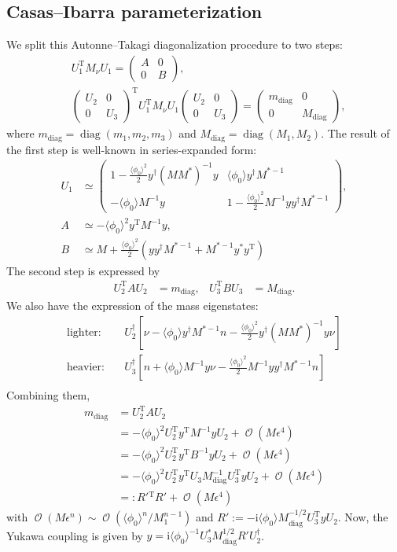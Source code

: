 \documentclass[a4paper,11pt]{scrartcl}
\numberwithin{equation}{section}
\newcommand\w[1]{_{\mathrm{#1}}}
\newcommand\ii{\mathrm{i}}
\newcommand\pmat[1]{\begin{pmatrix}#1\end{pmatrix}}
\DeclareMathOperator{\Order}{\mathcal{O}}
\newcommand\vev[1]{\langle#1\rangle}
\newcommand\YN{y}
\newcommand{\trans}{^{\mathrm T}}
\newcommand{\spmat}[1]{\left(\begin{smallmatrix}#1\end{smallmatrix}\right)}
\DeclareMathOperator{\diag}{\mathrm{diag}}
\begin{document}
\subsection{Casas--Ibarra parameterization}
We split this Autonne--Takagi diagonalization procedure to two steps:
\begin{align}
   &U_1\trans  M_\nu U_1 = \spmat{A& 0 \\ 0&B},\\
   &\spmat{U_2&0\\0&U_3}\trans U_1\trans M_\nu U_1 \spmat{U_2&0\\0&U_3} = \spmat{m\w{diag} & 0 \\ 0 & M\w{diag}},
\end{align}
where $m\w{diag}=\diag(m_1, m_2, m_3)$ and $M\w{diag}=\diag(M_1, M_2)$.
The result of the first step is well-known in series-expanded form:
\begin{align}
U_1 &\simeq \pmat{
  1 - \frac{\vev{\phi_0}^2}{2}\YN^\dagger (MM^*)^{-1}\YN &
 \vev{\phi_0} \YN^\dagger M^{*-1}
\\
-\vev{\phi_0} M^{-1}\YN &
  1 - \frac{\vev{\phi_0}^2}{2} M^{-1}\YN\YN^\dagger M^{*-1}
},\\
 A &\simeq -\vev{\phi_0}^2 \YN\trans M^{-1} \YN,\\
 B &\simeq M + \frac{\vev{\phi_0}^2}{2} \left( \YN\YN^\dagger M^{*-1} + M^{*-1} \YN^* \YN\trans\right)
\end{align}
The second step is expressed by
\begin{align}
 U_2\trans A U_2 &= m\w{diag}, &
 U_3\trans B U_3 &= M\w{diag}.
\end{align}
We also have the expression of the mass eigenstates:
\begin{align}
 \text{lighter}:&\quad
  U_2^\dagger\left[
\nu
-\vev{\phi_0} \YN^\dagger M^{*-1} n
-\frac{\vev{\phi_0}^2}{2} \YN^\dagger (MM^*)^{-1}\YN\nu
\right]\\
 \text{heavier}:&\quad
  U_3^\dagger\left[
n
+\vev{\phi_0} M^{-1}\YN\nu
-\frac{\vev{\phi_0}^2}{2} M^{-1}\YN\YN^\dagger M^{*-1}n
\right]\\
\end{align}
Combining them,
\begin{align}
 m\w{diag} &=  U_2\trans A U_2\\
&= -\vev{\phi_0}^2U_2\trans \YN\trans M^{-1} \YN U_2 + \Order(M\epsilon^4)\\
&=-\vev{\phi_0}^2U_2\trans \YN\trans B^{-1} \YN U_2 + \Order(M\epsilon^4)\\
&=-\vev{\phi_0}^2U_2\trans \YN\trans U_3 M\w{diag}^{-1}U_3\trans \YN U_2 + \Order(M\epsilon^4)\\
&=: R'{}\trans R' + \Order(M\epsilon^4)
\end{align}
with $\Order(M\epsilon^n)\sim\Order(\vev{\phi_0}^n/M_1^{n-1})$ and $R':=-\ii\vev{\phi_0}M\w{diag}^{-1/2}U_3\trans yU_2$. Now, the Yukawa coupling is given by
$y=\ii\vev{\phi_0}^{-1}U_3^*M\w{diag}^{1/2}R'U_2^\dagger$.
\end{document}
